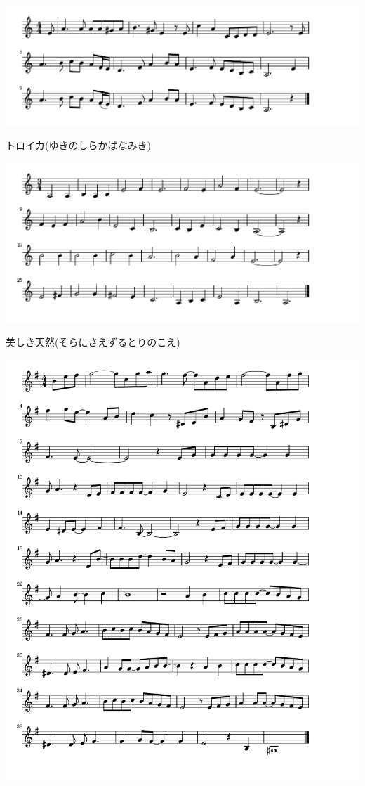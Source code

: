 \documentclass[a4paper]{ltjsarticle}
\begin{document}
\includegraphics[clip]{troika_crop.pdf}

\vspace{-10mm} \hspace{10mm}
トロイカ(ゆきのしらかばなみき)

\includegraphics[clip]{utsukushiki_crop.pdf}

\vspace{-10mm} \hspace{10mm}
美しき天然(そらにさえずるとりのこえ)

\includegraphics[clip]{fuyunosonata_crop.pdf}
\end{document}
